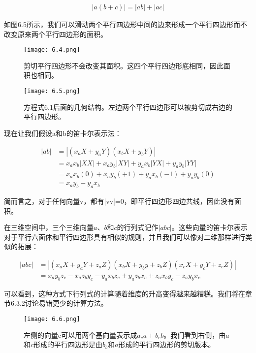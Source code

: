 \documentclass[lang=cn,12pt]{elegantbook}
\begin{document}
\begin{align}
|a(b+c)| =  |ab| + |ac|
\end{align}

如图6.5所示，我们可以滑动两个平行四边形中间的边来形成一个平行四边形而不改变原来两个平行四边形的面积。

\begin{figure}[htbp]
\centering
\texttt{[image: 6.4.png]}
\caption{剪切平行四边形不会改变其面积。这四个平行四边形底相同，因此面积也相同。}
\end{figure}

\begin{figure}[htbp]
\centering
\texttt{[image: 6.5.png]}
\caption{方程式6.1后面的几何结构。左边两个平行四边形可以被剪切成右边的平行四边形。}
\end{figure}

现在让我们假设a和b的笛卡尔表示法：

\begin{align}
|ab| &= |(x_aX + y_aY)(x_bX + y_bY)| \nonumber\\
&=x_ax_b|XX|+x_ay_b|XY|+y_ax_b|YX|+y_ay_b|YY| \nonumber\\
&=x_ax_b(0)+x_ay_b(+1)+y_ax_b(-1)+y_ay_b(0) \nonumber\\
& = x_a y_b - y_a x_b \nonumber
\end{align}

简而言之，对于任何向量v，都有|vv|=0，即平行四边形四边共线，因此没有面积。

在三维空间中，三个三维向量$a$、$b$和$c$的行列式记作$|abc|$。这些向量的笛卡尔表示对于平行六面体和平行四边形具有相似的规则，并且我们可以像对二维那样进行类似的拓展：

\begin{align}
|abc| &= |(x_aX+y_aY+z_aZ)(x_bX+y_by+z_bZ)(x_cX+y_cY+z_cZ)| \nonumber\\
&=x_ay_bz_c-x_az_by_c-y_ax_bz_c+y_az_bx_c+z_ax_by_c-z_ay_bx_c \nonumber
\end{align}

可以看到，这种方式下行列式的计算随着维度的升高变得越来越糟糕。我们将在章节6.3.2讨论易错更少的计算方法。


\begin{figure}[htbp]
\centering
\texttt{[image: 6.6.png]}
\caption{左侧的向量c可以用两个基向量表示成$a_ca+b_cb$。我们看到右侧，由$a$和$c$形成的平行四边形是由$b_b$和$a$形成的平行四边形的剪切版本。}
\end{figure}
\end{document}
